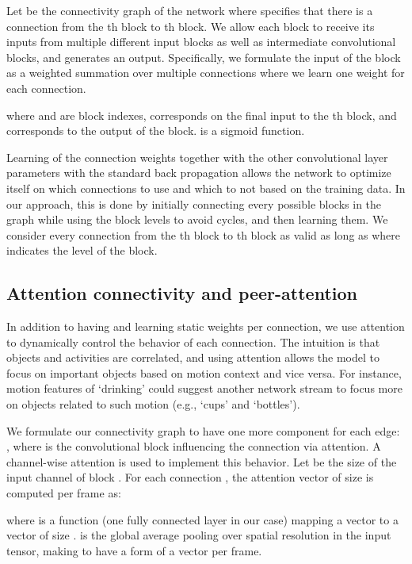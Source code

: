 \documentclass[runningheads]{llncs}
\begin{document}
Let  be the connectivity graph of the network where  specifies that there is a connection from the th block to th block. We allow each block to receive its inputs from multiple different input blocks as well as intermediate convolutional blocks, and generates an output. Specifically, we formulate the input of the block as a weighted summation over multiple connections where we learn one weight for each connection.

where  and  are block indexes,  corresponds on the final input to the th block, and  corresponds to the output of the block.  is a sigmoid function.

Learning of the connection weights together with the other convolutional layer parameters with the standard back propagation allows the network to optimize itself on which connections to use and which to not based on the training data. In our approach, this is done by initially connecting every possible blocks in the graph while using the block levels to avoid cycles, and then learning them. We consider every connection  from the th block to th block as valid as long as  where  indicates the level of the block.

\subsection{Attention connectivity and peer-attention}
\label{sec:attention}

In addition to having and learning static weights per connection, we use attention to dynamically control the behavior of each connection. The intuition is that objects and activities are correlated, and using attention allows the model to focus on important objects based on motion context and vice versa. 
For instance, motion features of `drinking' could suggest another network stream to focus more on objects related to such motion (e.g., `cups' and `bottles').




We formulate our connectivity graph  to have one more component for each edge: , where  is the convolutional block influencing the connection  via attention. 
A channel-wise attention is used to implement this behavior. Let  be the size of the input channel of block . For each connection , the attention vector of size  is computed per frame as:

where  is a function (one fully connected layer in our case) mapping a vector to a vector of size .  is the global average pooling over spatial resolution in the input tensor, making  to have a form of a vector per frame.
\end{document}

